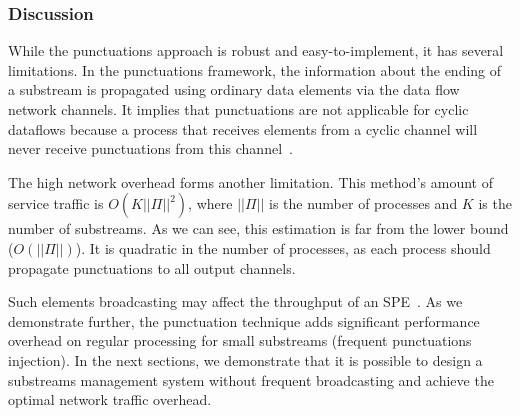 \subsubsection{Discussion}

While the punctuations approach is robust and easy-to-implement, it has several limitations. In the punctuations framework, the information about the ending of a substream is propagated using ordinary data elements via the data flow network channels. It implies that punctuations are not applicable for cyclic dataflows because a process that receives elements from a cyclic channel will never receive punctuations from this channel~\cite{carbone2018scalable}.

The high network overhead forms another limitation. This method's amount of service traffic is $O(K||\Pi||^2)$, where $||\Pi||$ is the number of processes and $K$ is the number of substreams. As we can see, this estimation is far from the lower bound ($O(||\Pi||)$). It is quadratic in the number of processes, as each process should propagate punctuations to all output channels. 

Such elements broadcasting may affect the throughput of an SPE~\cite{Li:2008:OPN:1453856.1453890}. As we demonstrate further, the punctuation technique adds significant performance overhead on regular processing for small substreams (frequent punctuations injection). In the next sections, we demonstrate that it is possible to design a substreams management system without frequent broadcasting and achieve the optimal network traffic overhead.
